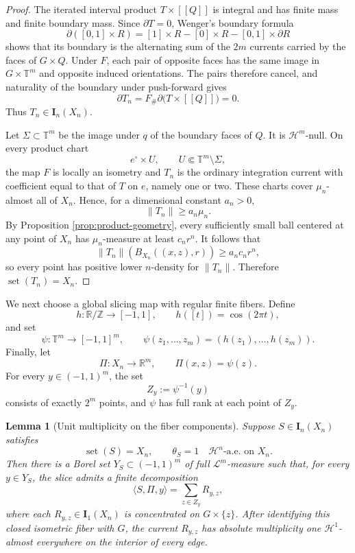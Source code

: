 \documentclass[11pt]{article}
\newtheorem{lemma}[theorem]{Lemma}
\theoremstyle{remark}
\newcommand{\I}{\mathbf I}
\newcommand{\Hh}{\mathcal H}
\newcommand{\set}{\operatorname{set}}
\newcommand{\llbracket}{[\![}
\newcommand{\rrbracket}{]\!]}
\begin{document}
\begin{proof}
The iterated interval product $T\times\llbracket Q\rrbracket$ is integral and has finite mass and finite boundary mass. Since $\partial T=0$, Wenger's boundary formula
\[
 \partial([0,1]\times R)
 =[1]\times R-[0]\times R-[0,1]\times\partial R
\]
shows that its boundary is the alternating sum of the $2m$ currents carried by the faces of $G\times Q$. Under $F$, each pair of opposite faces has the same image in $G\times\mathbb T^m$ and opposite induced orientations. The pairs therefore cancel, and naturality of the boundary under push-forward gives
\[
       \partial T_n
       =F_\#\partial\bigl(T\times\llbracket Q\rrbracket\bigr)=0.
\]
Thus $T_n\in\I_n(X_n)$.

Let $\Sigma\subset\mathbb T^m$ be the image under $q$ of the boundary faces of $Q$. It is $\Hh^m$-null. On every product chart
\[
       e^\circ\times U,
       \qquad U\Subset\mathbb T^m\setminus\Sigma,
\]
the map $F$ is locally an isometry and $T_n$ is the ordinary integration current with coefficient equal to that of $T$ on $e$, namely one or two. These charts cover $\mu_n$-almost all of $X_n$. Hence, for a dimensional constant $a_n>0$,
\[
       \|T_n\|\ge a_n\mu_n.
\]
By Proposition \ref{prop:product-geometry}, every sufficiently small ball centered at any point of $X_n$ has $\mu_n$-measure at least $c_nr^n$. It follows that
\[
 \|T_n\|(B_{X_n}((x,z),r))\ge a_nc_nr^n,
\]
so every point has positive lower $n$-density for $\|T_n\|$. Therefore $\set(T_n)=X_n$.
\end{proof}

We next choose a global slicing map with regular finite fibers. Define
\[
 h:\mathbb R/\mathbb Z\longrightarrow[-1,1],
 \qquad h([t])=\cos(2\pi t),
\]
and set
\[
 \psi:\mathbb T^m\longrightarrow[-1,1]^m,
 \qquad
 \psi(z_1,\ldots,z_m)=(h(z_1),\ldots,h(z_m)).
\]
Finally, let
\begin{equation}\label{eq:slicing-map}
 \Pi:X_n\longrightarrow\mathbb R^m,
 \qquad
 \Pi(x,z)=\psi(z).
\end{equation}
For every $y\in(-1,1)^m$, the set
\[
       Z_y:=\psi^{-1}(y)
\]
consists of exactly $2^m$ points, and $\psi$ has full rank at each point of $Z_y$.

\begin{lemma}[Unit multiplicity on the fiber components]\label{lem:slice-unit}
Suppose $S\in\I_n(X_n)$ satisfies
\[
       \set(S)=X_n,
       \qquad
       \theta_S=1\quad\Hh^n\text{-a.e. on }X_n.
\]
Then there is a Borel set $Y_S\subset(-1,1)^m$ of full
$\mathcal L^m$-measure such that, for every $y\in Y_S$, the slice admits a
finite decomposition
\[
       \langle S,\Pi,y\rangle
       =\sum_{z\in Z_y}R_{y,z},
\]
where each $R_{y,z}\in\I_1(X_n)$ is concentrated on
$G\times\{z\}$. After identifying this closed isometric fiber with $G$,
the current $R_{y,z}$ has absolute multiplicity one $\Hh^1$-almost
everywhere on the interior of every edge.
\end{lemma}
\end{document}
